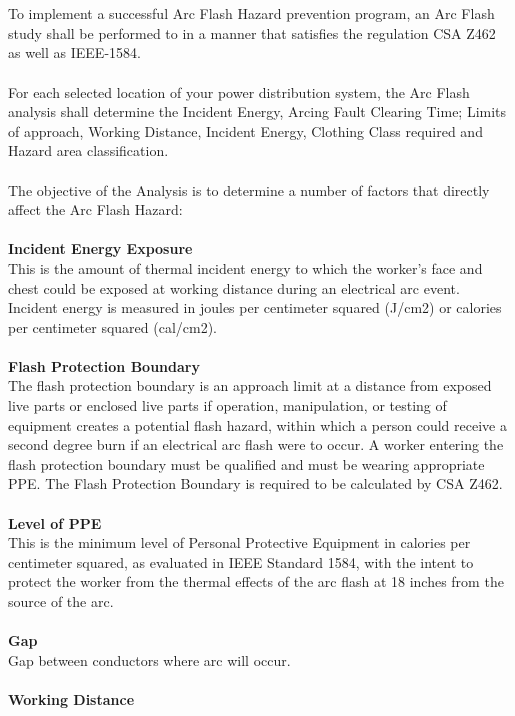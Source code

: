 \\
\\
To implement a successful Arc Flash Hazard prevention program, an Arc Flash study shall be performed to in a manner that satisfies the regulation CSA Z462 as well as IEEE-1584.
\\
\\
For each selected location of your power distribution system, the Arc Flash analysis shall determine the Incident Energy, Arcing Fault Clearing Time; Limits of approach, 
Working Distance, Incident Energy, Clothing Class required and Hazard area classification.
\\
\\
The objective of the Analysis is to determine a number of factors that directly affect the Arc Flash Hazard:
\\
\\
\textbf{Incident Energy Exposure }\\   
This is the amount of thermal incident energy to which the worker's face and chest could be exposed at working distance during an electrical arc event. Incident energy is measured in joules per centimeter squared (J/cm2) or calories per centimeter squared (cal/cm2). 
\\
\\  
\textbf{Flash Protection Boundary }\\   
The flash protection boundary is an approach limit at a distance from exposed live parts or enclosed live parts if operation, manipulation, or testing of equipment creates a potential flash hazard, within which a person could receive a second degree burn if an electrical arc flash were to occur. A worker entering the flash protection boundary must be qualified and must be wearing appropriate PPE. The Flash Protection Boundary is required to be calculated by CSA Z462. 
\\
\\ 
\textbf{Level of PPE} \\   
This is the minimum level of Personal Protective Equipment in calories per centimeter squared, as evaluated in IEEE Standard 1584, with the intent to protect the worker from the thermal effects of the arc flash at 18 inches from the source of the arc.
\\
\\		
\textbf{Gap}\\
Gap between conductors where arc will occur.
\\
\\		
\textbf{Working Distance}\\

